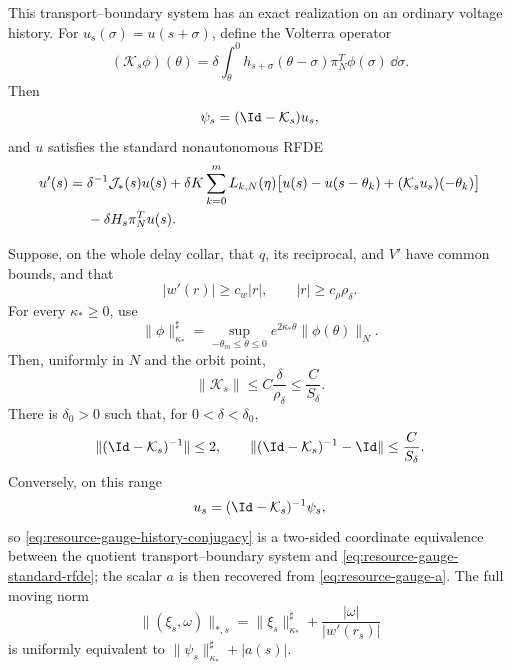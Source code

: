 \begin{proposition}
This transport--boundary system has an exact realization on an ordinary
voltage history.  For \(u_s(\sigma)=u(s+\sigma)\), define the Volterra
operator
\begin{equation}
 (\mathcal K_s\phi)(\theta)
 =\delta\int_\theta^0
 h_{s+\sigma}(\theta-\sigma)\pi_N^T\phi(\sigma)\,\dd\sigma.
                                                               \label{eq:resource-gauge-volterra}
\end{equation}
Then
\begin{equation}
 \psi_s=(\Id-\mathcal K_s)u_s,                       \label{eq:resource-gauge-history-conjugacy}
\end{equation}
and \(u\) satisfies the standard nonautonomous RFDE
\begin{align}
 u'(s)={}&\delta^{-1}\mathcal J_*(s)u(s)
 +\delta K\sum_{k=0}^mL_{k,N}(\eta)
 \bigl[u(s)-u(s-\theta_k)
       +(\mathcal K_su_s)(-\theta_k)\bigr]\notag\\
 &-\delta H_s\pi_N^Tu(s).                           \label{eq:resource-gauge-standard-rfde}
\end{align}

Suppose, on the whole delay collar, that \(q\), its reciprocal, and \(V'\)
have common bounds, and that
\begin{equation}
 |w'(r)|\ge c_w|r|,\qquad |r|\ge c_\rho\rho_\delta. \label{eq:resource-gauge-collar-bounds}
\end{equation}
For every \(\kappa_*\ge0\), use
\[
 \|\phi\|^\sharp_{\kappa_*}
 =\sup_{-\theta_m\le\theta\le0}
 e^{2\kappa_*\theta}\|\phi(\theta)\|_N.
\]
Then, uniformly in \(N\) and the orbit point,
\begin{equation}
 \|\mathcal K_s\|
 \le C\frac{\delta}{\rho_\delta}
 \le\frac{C}{S_\delta}.                             \label{eq:resource-gauge-volterra-bound}
\end{equation}
There is \(\delta_0>0\) such that, for \(0<\delta<\delta_0\),
\begin{equation}
 \|(\Id-\mathcal K_s)^{-1}\|\le2,\qquad
 \|(\Id-\mathcal K_s)^{-1}-\Id\|\le\frac{C}{S_\delta}.
                                                               \label{eq:resource-gauge-volterra-inverse}
\end{equation}
Conversely, on this range
\begin{equation}
 u_s=(\Id-\mathcal K_s)^{-1}\psi_s,                 \label{eq:resource-gauge-history-inverse}
\end{equation}
so \cref{eq:resource-gauge-history-conjugacy} is a two-sided coordinate
equivalence between the quotient transport--boundary system and
\cref{eq:resource-gauge-standard-rfde}; the scalar \(a\) is then recovered
from \cref{eq:resource-gauge-a}.
The full moving norm
\begin{equation}
 \|(\xi_s,\omega)\|_{*,s}
 =\|\xi_s\|^\sharp_{\kappa_*}
   +\frac{|\omega|}{|w'(r_s)|}                      \label{eq:resource-gauge-anisotropic-norm}
\end{equation}
is uniformly equivalent to
\(\|\psi_s\|^\sharp_{\kappa_*}+|a(s)|\).
\end{proposition}

